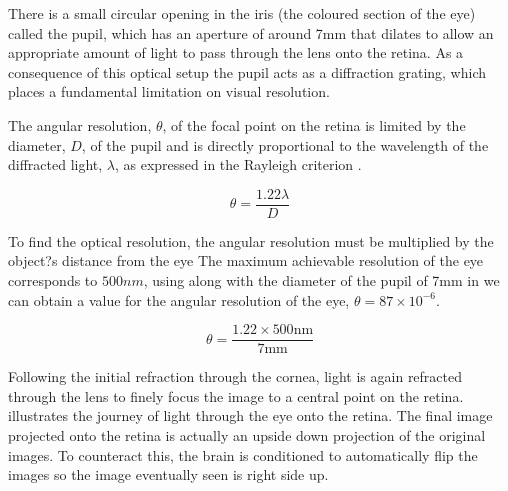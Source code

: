 There is a small circular opening in the iris (the coloured section of
the eye) called the pupil, which has an \gls{aperture} of around 7mm that
dilates to allow an appropriate amount of light to pass through
the lens onto the retina.\cite{krugman1964some} As a consequence of
this optical setup the pupil acts as a diffraction grating, which places a 
fundamental limitation on visual resolution. 

The angular resolution, $\theta$, of the focal point on the retina is limited by
the diameter, $D$, of the pupil and is directly proportional to the wavelength
of the diffracted light, $\lambda$, as expressed in the Rayleigh criterion
 .\cite{rayleigh1907dynamical}

\begin{equation}
\theta=\frac{1.22\lambda}{D}
\label{eq:res_limit}
\end{equation}

To find the optical resolution, the angular resolution must be multiplied by the
object?s distance from the eye The maximum achievable resolution of the eye
corresponds  to $500nm$, using  along with the diameter of
the pupil of 7mm in  we can obtain a value for the angular
resolution of the eye, $\theta=87\times 10^{-6}$.

\begin{equation}
\theta=\frac{1.22\times 500\textrm{nm}}{7\textrm{mm}}
\label{eq:eye_res}
\end{equation}

Following the initial refraction through the \gls{cornea}, light is again refracted
through the lens to finely focus the image to a central point on the retina.
 illustrates the journey of light through the eye
onto the retina. The final image projected onto the retina is actually an
upside down projection of the original images. To counteract this, the
brain is conditioned to automatically flip the images so the image eventually
seen is right side up.

